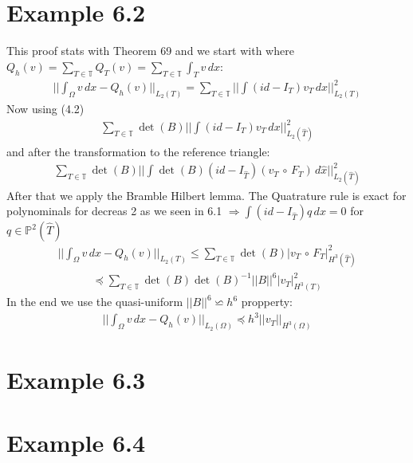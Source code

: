 \documentclass[11pt,a4paper]{article}
\begin{document}
\section{Example 6.2}
This proof stats with Theorem 69 and we start with where $Q_h(v) = \sum_{T \in \mathbb{T}}Q_T(v) =\sum_{T \in \mathbb{T}} \int_{T}v \, dx$:
\begin{align*}
||\int_{\Omega} v \, dx -Q_h(v)||_{L_2(T)} = \sum_{T \in \mathbb{T}}||\int(id-I_T)v_T\, dx ||^2_{L_2(T)} 
\end{align*}
Now using (4.2)
\begin{align*}
\sum_{T \in \mathbb{T}}\det(B)||\int(id-I_T)v_T\,dx||^2_{L_2(\hat{T})}
\end{align*}
and after the transformation to the reference triangle:
\begin{align*}
\sum_{T \in \mathbb{T}}\det(B)||\int \det(B)(id-I_{\hat{T}})(v_T\,\circ\,F_T)\,d\hat{x}||^2_{L_2(\hat{T})}
\end{align*}
After that we apply the Bramble Hilbert lemma. The Quatrature rule is exact for polynominals for decreas 2 as we seen in 6.1 $\Rightarrow \int(id-I_{\hat{T}})q\,dx = 0$ for $q \in \mathbb{P}^2(\hat{T})$
\begin{align*}
||\int_{\Omega} v \, dx -Q_h(v)||_{L_2(T)} \leq \sum_{T \in \mathbb{T}} \det(B)|v_T\,\circ\,F_T|^2_{H^3(\hat{T})}
\end{align*}
\begin{align*}
\preceq \sum_{T \in \mathbb{T}}\det(B)\det(B)^{-1}||B||^6|v_T|^2_{H^3(T)}
\end{align*}
In the end we use the quasi-uniform $||B||^6 \backsimeq h^6$ propperty:
\begin{align*}
||\int_{\Omega}v\,dx-Q_h(v)||_{L_2(\Omega)}\preceq h^3||v_T||_{H^3(\Omega)}
\end{align*}
\section{Example 6.3}
\section{Example 6.4}
\end{document}
